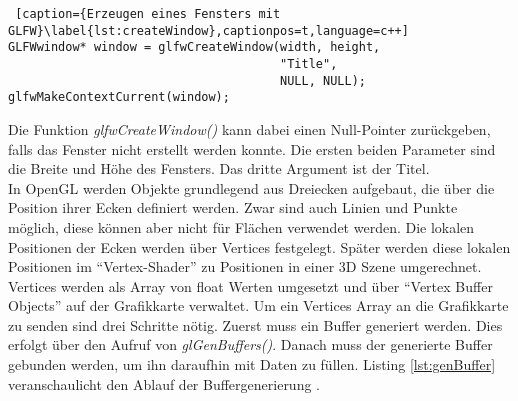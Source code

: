 \documentclass[11pt,a4paper]{article}
\begin{document}
\begin{lstlisting} [caption={Erzeugen eines Fensters mit GLFW}\label{lst:createWindow},captionpos=t,language=c++]
GLFWwindow* window = glfwCreateWindow(width, height,
                                      "Title",
                                      NULL, NULL);
glfwMakeContextCurrent(window);
\end{lstlisting}
\noindent
Die Funktion \mbox{\textit{glfwCreateWindow()}} kann dabei einen Null-Pointer zurückgeben, falls das Fenster nicht erstellt werden konnte. Die ersten beiden Parameter sind die Breite und Höhe des Fensters. Das dritte Argument ist der Titel.\\
In OpenGL werden Objekte grundlegend aus Dreiecken aufgebaut, die über die Position ihrer Ecken definiert werden. Zwar sind auch Linien  und Punkte möglich, diese können aber nicht für Flächen verwendet werden. Die lokalen Positionen der Ecken werden über Vertices festgelegt. Später werden diese lokalen Positionen im ``Vertex-Shader'' zu Positionen in einer 3D Szene umgerechnet.\\
Vertices werden als Array von float Werten umgesetzt und über ``Vertex Buffer Objects'' auf der Grafikkarte verwaltet. Um ein Vertices Array an die Grafikkarte zu senden sind drei Schritte nötig. Zuerst muss ein Buffer generiert werden. Dies erfolgt über den Aufruf von \mbox{\textit{glGenBuffers()}}. Danach muss der generierte Buffer gebunden werden, um ihn daraufhin mit Daten zu füllen. Listing \ref{lst:genBuffer} veranschaulicht den Ablauf der Buffergenerierung \cite[Hello-Triangle]{LearnOpenGL}.
\end{document}
